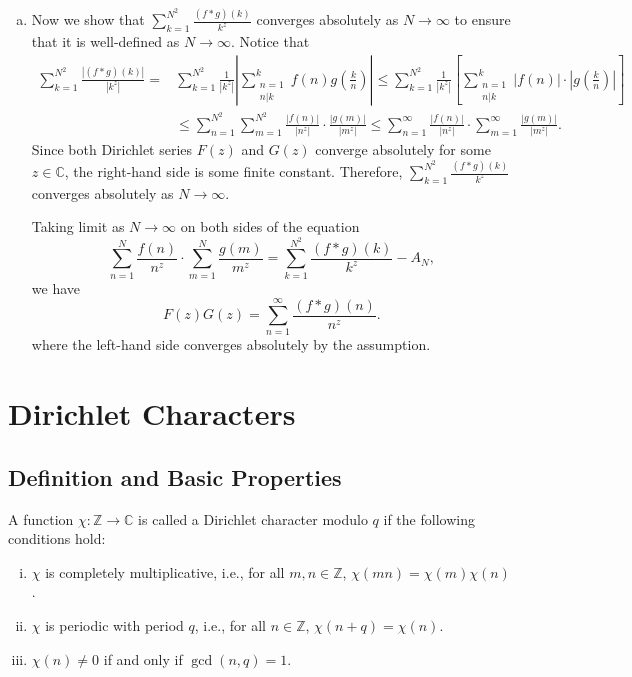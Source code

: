 \documentclass{elegantbook}
\begin{document}
\begin{problemset}[Exercises]
\begin{solution}
\begin{enumerate}[(a)]
      \item Now we show that $\sum_{k=1}^{N^2} \frac{(f*g)(k)}{k^z}$ converges absolutely as $N \to \infty$ to ensure that it is well-defined as $N \to \infty$. Notice that
      \[
      \begin{aligned}
        \sum_{k=1}^{N^2} \frac{|(f*g)(k)|}{|k^z|} = &\sum_{k=1}^{N^2} \frac{1}{|k^z|} \left| \sum_{\substack{n=1 \\ n|k}}^{k} f(n) g\left(\frac{k}{n}\right) \right| \leq \sum_{k=1}^{N^2} \frac{1}{|k^z|} \left[ \sum_{\substack{n=1 \\ n|k}}^{k} |f(n)| \cdot \left| g\left(\frac{k}{n}\right) \right| \right] \\
        &\leq \sum_{n=1}^{N^2} \sum_{m=1}^{N^2} \frac{|f(n)|}{|n^z|} \cdot \frac{|g(m)|}{|m^z|} \leq \sum_{n=1}^{\infty} \frac{|f(n)|}{|n^z|} \cdot \sum_{m=1}^{\infty} \frac{|g(m)|}{|m^z|}.
      \end{aligned}
      \]
      Since both Dirichlet series $F(z)$ and $G(z)$ converge absolutely for some $z \in \mathbb{C}$, the right-hand side is some finite constant. Therefore, $\sum_{k=1}^{N^2} \frac{(f*g)(k)}{k^z}$ converges absolutely as $N \to \infty$.
      
      Taking limit as $N \to \infty$ on both sides of the equation
      \[
        \sum^N_{n=1} \frac{f(n)} {n^z} \cdot \sum^N_{m=1} \frac{g(m)}{m^z} = \sum_{k=1}^{N^2} \frac{(f*g)(k)}{k^z} - A_N,
      \]
      we have
      \[
        F(z)G(z) = \sum_{n=1}^{\infty} \frac{(f * g)(n)}{n^z}.
      \]
      where the left-hand side converges absolutely by the assumption.
    \end{enumerate}
  \end{solution}
\end{problemset}


\chapter{Dirichlet Characters}

\section{Definition and Basic Properties}

\begin{definition}
  A function $\chi:\mathbb{Z}\to\mathbb{C}$ is called a Dirichlet character modulo $q$ if the following conditions hold:
  \begin{enumerate}[(i)]
    \item $\chi$ is completely multiplicative, i.e., for all $m,n\in \mathbb{Z}$, $\chi(mn)=\chi(m)\chi(n)$.
    \item $\chi$ is periodic with period $q$, i.e., for all $n\in \mathbb{Z}$, $\chi(n+q)=\chi(n)$.
    \item $\chi(n)\ne0$ if and only if $\gcd(n,q)= 1$.
  \end{enumerate}
\end{definition}
\end{document}
